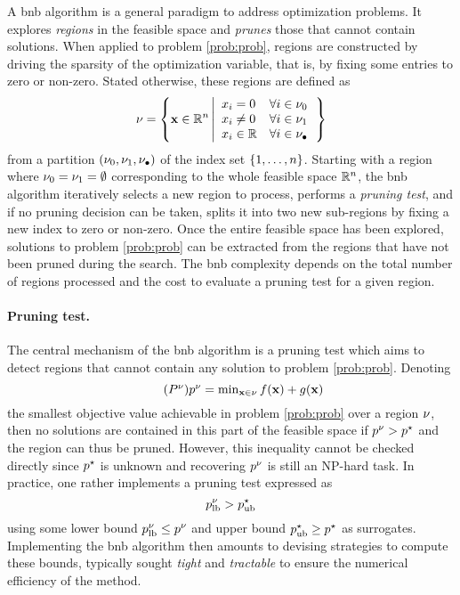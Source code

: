 \documentclass[11pt]{article}
\begin{document}
A \gls{bnb} algorithm is a general paradigm to address optimization problems.
It explores \emph{regions} in the feasible space and \emph{prunes} those that cannot contain solutions.
When applied to problem \eqref{prob:prob}, regions are constructed by driving the sparsity of the optimization variable, that is, by fixing some entries to zero or non-zero.
Stated otherwise, these regions are defined as
\begin{equation}
    \label{eq:region}
    \nodesymbol = \left\{
        \pv \in \kR^{\pdim}
        \left|
        \begin{array}{ll}
            \pvi{\idxentry} = 0 &\forall \idxentry \in \setzero \\
            \pvi{\idxentry} \neq 0 &\forall \idxentry \in \setone \\
            \pvi{\idxentry} \in \kR &\forall \idxentry \in \setnone
        \end{array}
        \right.
    \right\}
\end{equation}
from a partition $(\nu_0,\nu_1,\nu_\bullet)$ of the index set $\{1,\dots,n\}$.
Starting with a region where $\nu_0 = \nu_1 = \emptyset$ corresponding to the whole feasible space $\kR^{\pdim}$, the \gls{bnb} algorithm iteratively selects a new region to process, performs a \emph{pruning test}, and if no pruning decision can be taken, splits it into two new sub-regions by fixing a new index to zero or non-zero.
Once the entire feasible space has been explored, solutions to problem \eqref{prob:prob} can be extracted from the regions that have not been pruned during the search.
The \gls{bnb} complexity depends on the total number of regions processed and the cost to evaluate a pruning test for a given region.

\paragraph{Pruning test.}
The central mechanism of the \gls{bnb} algorithm is a pruning test which aims to detect regions that cannot contain any solution to problem \eqref{prob:prob}.
Denoting 
\begin{equation}
    \label{prob:prob-node}
    \tag{$\node{\ppb}$}
    \textstyle
    \node{\pobj} = \min_{\pv \in \nodesymbol} \lfunc(\pv) + \rfunc(\pv)
\end{equation}
the smallest objective value achievable in problem \eqref{prob:prob} over a region $\nu$, then no solutions are contained in this part of the feasible space if $p^\nu > p^{\star}$ and the region can thus be pruned.
However, this inequality cannot be checked directly since $p^{\star}$ is unknown and recovering $p^\nu$ is still an NP-hard task.
In practice, one rather implements a pruning test expressed as
\begin{equation}
    \label{eq:pruning-test}
    p_{\text{lb}}^\nu > p_{\text{ub}}^{\star}
\end{equation}
using some lower bound $p_{\text{lb}}^\nu \leq p^\nu$ and upper bound $p_{\text{ub}}^{\star} \geq p^{\star}$ as surrogates.
Implementing the \gls{bnb} algorithm then amounts to devising strategies to compute these bounds, typically sought \emph{tight} and \emph{tractable} to ensure the numerical efficiency of the method.
\end{document}
